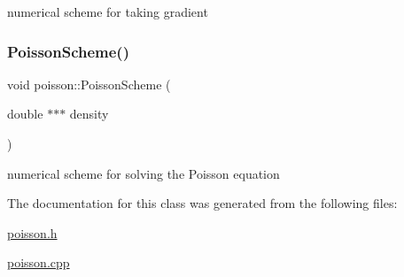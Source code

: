 numerical scheme for taking gradient 

\mbox{\label{classpoisson_ae1e3d81634d4af806778d49e113f2405}} 
\subsubsection{\texorpdfstring{Poisson\+Scheme()}{PoissonScheme()}}
{\footnotesize\ttfamily void poisson\+::\+Poisson\+Scheme (\begin{DoxyParamCaption}\item[{double $\ast$$\ast$$\ast$}]{density }\end{DoxyParamCaption})}



numerical scheme for solving the Poisson equation 



The documentation for this class was generated from the following files\+:\begin{DoxyCompactItemize}
\item 
\mbox{\hyperlink{poisson_8h}{poisson.\+h}}\item 
\mbox{\hyperlink{poisson_8cpp}{poisson.\+cpp}}\end{DoxyCompactItemize}
